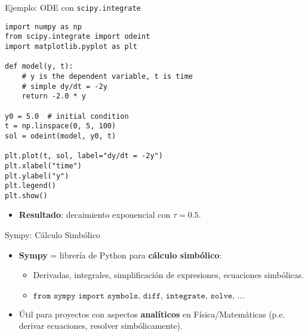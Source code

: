 \documentclass[10pt]{beamer}
\begin{document}
\begin{frame}[fragile]{Ejemplo: ODE con \texttt{scipy.integrate}}
\begin{verbatim}
import numpy as np
from scipy.integrate import odeint
import matplotlib.pyplot as plt

def model(y, t):
    # y is the dependent variable, t is time
    # simple dy/dt = -2y
    return -2.0 * y

y0 = 5.0  # initial condition
t = np.linspace(0, 5, 100)
sol = odeint(model, y0, t)

plt.plot(t, sol, label="dy/dt = -2y")
plt.xlabel("time")
plt.ylabel("y")
plt.legend()
plt.show()
\end{verbatim}
\begin{itemize}
  \item \textbf{Resultado}: decaimiento exponencial con \(\tau=0.5\).
\end{itemize}
\end{frame}

\begin{frame}{Sympy: Cálculo Simbólico}
  \begin{itemize}
    \item \textbf{Sympy} = librería de Python para \textbf{cálculo simbólico}:
      \begin{itemize}
        \item Derivadas, integrales, simplificación de expresiones, ecuaciones simbólicas.
        \item \(\texttt{from sympy import symbols, diff, integrate, solve, ...}\)
      \end{itemize}
    \item Útil para proyectos con aspectos \textbf{analíticos} en Física/Matemáticas (p.e. derivar ecuaciones, resolver simbólicamente).
  \end{itemize}
\end{frame}

\end{document}
